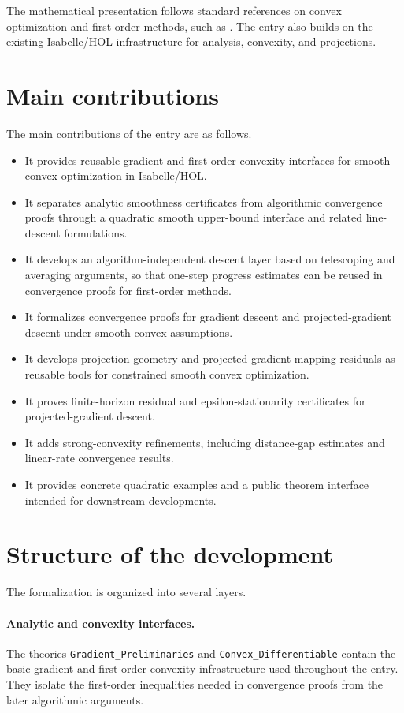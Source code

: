\documentclass[11pt,a4paper]{article}
\begin{document}
The mathematical presentation follows standard references on convex optimization and first-order methods, such as \cite{Nesterov2004,Nesterov2018,Beck2017,Bertsekas1999}.
The entry also builds on the existing Isabelle/HOL infrastructure for analysis, convexity, and projections.

\section{Main contributions}

The main contributions of the entry are as follows.

\begin{itemize}
  \item It provides reusable gradient and first-order convexity interfaces for smooth convex optimization in Isabelle/HOL.
  \item It separates analytic smoothness certificates from algorithmic convergence proofs through a quadratic smooth upper-bound interface and related line-descent formulations.
  \item It develops an algorithm-independent descent layer based on telescoping and averaging arguments, so that one-step progress estimates can be reused in convergence proofs for first-order methods.
  \item It formalizes convergence proofs for gradient descent and projected-gradient descent under smooth convex assumptions.
  \item It develops projection geometry and projected-gradient mapping residuals as reusable tools for constrained smooth convex optimization.
  \item It proves finite-horizon residual and epsilon-stationarity certificates for projected-gradient descent.
  \item It adds strong-convexity refinements, including distance-gap estimates and linear-rate convergence results.
  \item It provides concrete quadratic examples and a public theorem interface intended for downstream developments.
\end{itemize}

\section{Structure of the development}

The formalization is organized into several layers.

\paragraph{Analytic and convexity interfaces.}
The theories \texttt{Gradient\_Preliminaries} and \texttt{Convex\_Differentiable} contain the basic gradient and first-order convexity infrastructure used throughout the entry.
They isolate the first-order inequalities needed in convergence proofs from the later algorithmic arguments.
\end{document}
